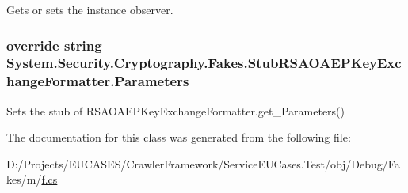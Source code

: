 Gets or sets the instance observer.

\hypertarget{class_system_1_1_security_1_1_cryptography_1_1_fakes_1_1_stub_r_s_a_o_a_e_p_key_exchange_formatter_a407653b22b5d5fc9bfeef8fa41516d92}{
\subsubsection[{Parameters}]{\setlength{\rightskip}{0pt plus 5cm}override string System.\-Security.\-Cryptography.\-Fakes.\-Stub\-R\-S\-A\-O\-A\-E\-P\-Key\-Exchange\-Formatter.\-Parameters\hspace{0.3cm}{\ttfamily [get]}}}\label{class_system_1_1_security_1_1_cryptography_1_1_fakes_1_1_stub_r_s_a_o_a_e_p_key_exchange_formatter_a407653b22b5d5fc9bfeef8fa41516d92}


Sets the stub of R\-S\-A\-O\-A\-E\-P\-Key\-Exchange\-Formatter.\-get\-\_\-\-Parameters()



The documentation for this class was generated from the following file\-:\begin{DoxyCompactItemize}
\item 
D\-:/\-Projects/\-E\-U\-C\-A\-S\-E\-S/\-Crawler\-Framework/\-Service\-E\-U\-Cases.\-Test/obj/\-Debug/\-Fakes/m/\hyperlink{m_2f_8cs}{f.\-cs}\end{DoxyCompactItemize}
